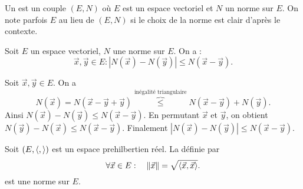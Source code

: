 \documentclass{book}
\begin{document}
\begin{Definition}
Un  est un couple $(E,N)$ où $E$ est un espace vectoriel et $N$ un norme sur $E$.
On note parfois $E$ au lieu de $(E,N)$ si le choix de la norme est clair d'après le contexte.
\end{Definition}
\begin{Proposition}
Soit $E$ un espace vectoriel, $N$ une norme sur $E$. On a :
$$\vec{x},\vec{y}\in E: |N(\vec{x}) - N(\vec{y})|\leq N(\vec{x}-\vec{y}).$$
\end{Proposition}
\begin{Demonstration}
Soit $\vec{x},\vec{y}\in E$. On a $$N(\vec{x})=N(\vec{x}-\vec{y}+\vec{y})\overbrace{\leq}^{\text{inégalité triangulaire}} N(\vec{x}-\vec{y})+N(\vec{y}).$$
Ainsi $N(\vec{x})-N(\vec{y})\leq N(\vec{x}-\vec{y}).$ En permutant $\vec{x}$ et $\vec{y}$, on obtient $N(\vec{y})-N(\vec{x})\leq N(\vec{x}-\vec{y}).$ Finalement $|N(\vec{x}) - N(\vec{y})|\leq N(\vec{x}-\vec{y}).$
\end{Demonstration}
\begin{Proposition}
Soit $(E,\langle,\rangle)$ est un espace prehilbertien réel.
La  définie par 
$$ \forall \vec{x}\in E:\quad  \mathopen\lVert \vec{x} \mathclose\rVert =\sqrt{\langle\vec{x},\vec{x}\rangle}.$$
est une norme sur $E$. 
\end{Proposition}
\end{document}
